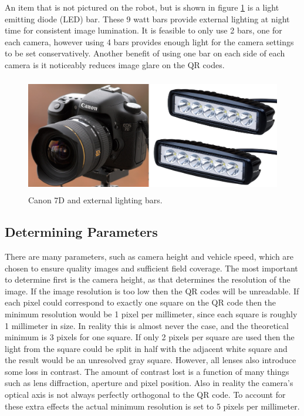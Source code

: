 An item that is not pictured on the robot, but is shown in figure \ref{figure:canon_and_bars} is a light emitting diode (LED) bar.  These 9 watt bars provide external lighting at night time for consistent image lumination.  It is feasible to only use 2 bars, one for each camera, however using 4 bars provides enough light for the camera settings to be set conservatively.  Another benefit of using one bar on each side of each camera is it noticeably reduces image glare on the QR codes.  

\begin{figure}[htb]
	\centering
    \includegraphics[height=2in]{figures/canon7d_and_LEDs.png}
    \caption[Canon 7D and LED bars]{Canon 7D and external lighting bars.}
    \label{figure:canon_and_bars}
\end{figure}

\subsection{Determining Parameters}
\label{section:determining_parameters}

There are many parameters, such as camera height and vehicle speed, which are chosen to ensure quality images and sufficient field coverage.  The most important to determine first is the camera height, as that determines the resolution of the image.  If the image resolution is too low then the QR codes will be unreadable.  
If each pixel could correspond to exactly one square on the QR code then the minimum resolution would be 1 pixel per millimeter, since each square is roughly 1 millimeter in size.  In reality this is almost never the case, and the theoretical minimum is 3 pixels for one square.  If only 2 pixels per square are used then the light from the square could be split in half with the adjacent white square and the result would be an unresolved gray square.  However, all lenses also introduce some loss in contrast.  The amount of contrast lost is a function of many things such as lens diffraction, aperture and pixel position.  Also in reality the camera's optical axis is not always perfectly orthogonal to the QR code.  To account for these extra effects the actual minimum resolution is set to 5 pixels per millimeter.  

